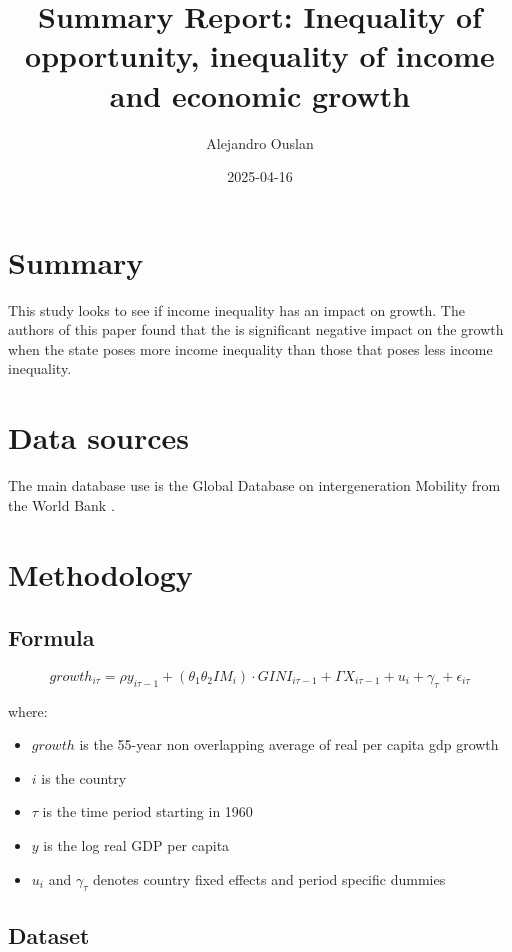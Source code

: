 \documentclass[10pt, oneside]{article}
\title{Summary Report: Inequality of opportunity, inequality of income and economic growth}
\author{Alejandro Ouslan}
\date{2025-04-16}
\begin{document}
\maketitle
\tableofcontents

\vspace{.25in}

\section{Summary}
This study \cite{aiyar2020inequality} looks to see if income inequality has an impact on growth. The authors of this paper found that
the is significant negative impact on the growth when the state poses more income inequality than those that poses less income inequality.
\section{Data sources}
The main database use is the Global Database on intergeneration Mobility from the World Bank \cite{gdim2018global}.

\section{Methodology}

\subsection{Formula}
\begin{equation}
	growth_{i \tau} = \rho y_{i \tau - 1} + (\theta_1 \theta_2 IM_i) \cdot GINI_{i \tau -1} + \Gamma X_{i \tau-1} + u_i + \gamma_{\tau} + \epsilon_{i \tau}
\end{equation}

where:
\begin{itemize}
	\item $growth$ is the 55-year non overlapping average of real per capita gdp growth
	\item $i$ is the country
	\item $\tau$ is the time period starting in 1960
	\item $y$ is the log real GDP per capita
	\item $u_i$ and $\gamma_\tau$ denotes country fixed effects and period specific dummies
\end{itemize}

\subsection{Dataset}
\end{document}
